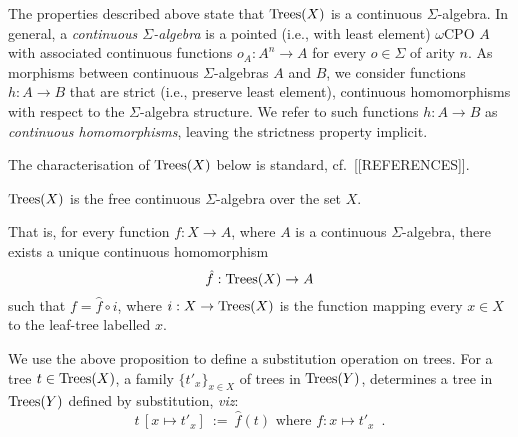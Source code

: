 The properties described above state that $\textnormal{Trees}(X)$ is a continuous $\Sigma$-algebra. In general,
a \emph{continuous $\Sigma$-algebra} is a pointed (i.e., with least element) $\omega$CPO $A$ with associated
continuous functions $o_A : A^n \to A$ for every $o \in \Sigma$ of arity $n$. 
As morphisms between continuous $\Sigma$-algebras
$A$ and $B$, we consider functions $h: A \to B$  that are strict (i.e., preserve least element), continuous homomorphisms with respect to the $\Sigma$-algebra structure. 
We refer to such  functions $h: A \to B$ as \emph{continuous homomorphisms}, leaving the strictness property implicit.

The characterisation of $\textnormal{Trees}(X)$ below is standard, cf.\ [[REFERENCES]].
\begin{aproposition}
$\textnormal{Trees}(X)$ is the free
    continuous $\Sigma$-algebra over the set $X$.
   \begin{center}
    \end{center}
    That is, for every function $f : X \to A$, where 
    $A$ is a continuous $\Sigma$-algebra,
    there exists a unique continuous homomorphism $$\hat{f} : \textnormal{Trees}(X) \to A$$
    such that $
        f = \hat{f} \circ i $, where $i : X \to \textnormal{Trees}(X)$ is the function mapping every $x \in X$ to the 
        leaf-tree labelled $x$.
 \end{aproposition}
 
 We use the above proposition to define a substitution operation on trees. For a tree $t \in \textnormal{Trees}(X)$, 
 a family $\{t'_x\}_{x \in X}$ of trees in $\textnormal{Trees}(Y)$, determines a tree in $\textnormal{Trees}(Y)$ defined by substitution, \emph{viz}:
 \[t\,[x \mapsto t'_x] ~ := ~ \text{$\hat{f}(t)$ where $f \colon x \mapsto t'_x$} \enspace .
 \]
